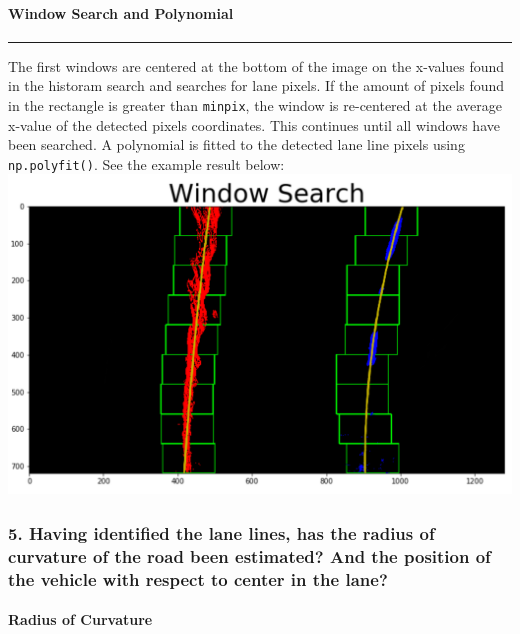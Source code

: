 \documentclass[11pt]{article}
\makeatletter
\def\maxwidth{\ifdim\Gin@nat@width>\linewidth\linewidth
    \else\Gin@nat@width\fi}
\let\Oldincludegraphics\includegraphics
\renewcommand{\includegraphics}[1]{\Oldincludegraphics[width=.8\maxwidth]{#1}}
\makeatother
\begin{document}
\hypertarget{window-search-and-polynomial}{%
\paragraph{Window Search and
Polynomial}\label{window-search-and-polynomial}}

\begin{center}\rule{0.5\linewidth}{\linethickness}\end{center}

The first windows are centered at the bottom of the image on the
x-values found in the historam search and searches for lane pixels. If
the amount of pixels found in the rectangle is greater than
\texttt{minpix}, the window is re-centered at the average x-value of the
detected pixels coordinates. This continues until all windows have been
searched. A polynomial is fitted to the detected lane line pixels using
\texttt{np.polyfit()}. See the example result below:
\includegraphics{./output_images/writeup_images/test1_window.png}

    \hypertarget{having-identified-the-lane-lines-has-the-radius-of-curvature-of-the-road-been-estimated-and-the-position-of-the-vehicle-with-respect-to-center-in-the-lane}{%
\subsubsection{5. Having identified the lane lines, has the radius of
curvature of the road been estimated? And the position of the vehicle
with respect to center in the
lane?}\label{having-identified-the-lane-lines-has-the-radius-of-curvature-of-the-road-been-estimated-and-the-position-of-the-vehicle-with-respect-to-center-in-the-lane}}

\hypertarget{radius-of-curvature}{%
\paragraph{Radius of Curvature}\label{radius-of-curvature}}
\end{document}

